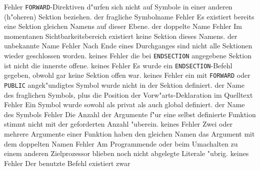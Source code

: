 \documentclass[12pt,a4paper,twoside]{report}
\newcommand{\tty}[1]{{\tt #1}}
\begin{document}
\begin{description}
               {Fehler}
               {\tty{FORWARD}-Direktiven d"urfen sich nicht auf Symbole in
                einer anderen (h"oheren) Sektion beziehen.}
               {der fragliche Symbolname}
               {Fehler}
               {Es existiert bereits eine Sektion gleichen
                Namens auf dieser Ebene.}
               {der doppelte Name}
               {Fehler}
               {Im momentanen Sichtbarkeitsbereich existiert
                keine Sektion dieses Namens.}
               {der unbekannte Name}
               {Fehler}
               {Nach Ende eines Durchganges sind nicht alle
                Sektionen wieder geschlossen worden.}
               {keines}
               {Fehler}
               {die bei \tty{ENDSECTION} angegebene Sektion
	        ist nicht die innerste offene.}
               {keines}
               {Fehler}
               {Es wurde ein \tty{ENDSECTION}-Befehl gegeben, obwohl
                gar keine Sektion offen war.}
               {keines}
               {Fehler}
               {ein mit \tty{FORWARD} oder \tty{PUBLIC}
	        angek"undigtes Symbol wurde nicht in der Sektion definiert.}
               {der Name des fraglichen Symbols, plus die
                Position der Vorw"arts-Deklaration im Quelltext}
               {Fehler}
               {Ein Symbol wurde sowohl als privat als auch
                global definiert.}
               {der Name des Symbols}
               {Fehler}
               {Die Anzahl der Argumente f"ur eine
                selbst definierte Funktion stimmt nicht mit der geforderten
                Anzahl "uberein.}
               {keines}
               {Fehler}
               {Zwei oder mehrere Argumente einer Funktion haben den gleichen
                Namen}
               {das Argument mit dem doppelten Namen}
               {Fehler}
               {Am Programmende oder beim Umachalten
                zu einem anderen Zielprozessor blieben noch nicht
                abgelegte Literale "ubrig.}
               {keines}
               {Fehler}
               {Der benutzte Befehl existiert zwar
}
\end{description}
\end{document}
